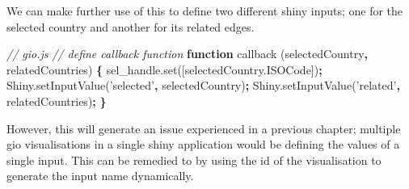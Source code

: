 \documentclass[10pt,]{krantz}
\makeatletter
\newenvironment{Shaded}{\begin{snugshade}}{\end{snugshade}}
\newcommand{\AttributeTok}[1]{\textcolor[rgb]{0.61,0.61,0.61}{#1}}
\newcommand{\CommentTok}[1]{\textcolor[rgb]{0.37,0.37,0.37}{\textit{#1}}}
\newcommand{\KeywordTok}[1]{\textcolor[rgb]{0.27,0.27,0.27}{\textbf{#1}}}
\newcommand{\NormalTok}[1]{#1}
\newcommand{\OperatorTok}[1]{\textcolor[rgb]{0.43,0.43,0.43}{\textbf{#1}}}
\newcommand{\StringTok}[1]{\textcolor[rgb]{0.5,0.5,0.5}{#1}}
\newcommand{\VariableTok}[1]{\textcolor[rgb]{0,0,0}{#1}}
\newenvironment{kframe}{%
\medskip{}
\setlength{\fboxsep}{.8em}
 \def\at@end@of@kframe{}%
 \ifinner\ifhmode%
  \def\at@end@of@kframe{\end{minipage}}%
  \begin{minipage}{\columnwidth}%
 \fi\fi%
 \def\FrameCommand##1{\hskip\@totalleftmargin \hskip-\fboxsep
 \colorbox{shadecolor}{##1}\hskip-\fboxsep
     \hskip-\linewidth \hskip-\@totalleftmargin \hskip\columnwidth}%
 \MakeFramed {\advance\hsize-\width
   \@totalleftmargin\z@ \linewidth\hsize
   \@setminipage}}%
 {\par\unskip\endMakeFramed%
 \at@end@of@kframe}
\renewenvironment{Shaded}{\begin{kframe}}{\end{kframe}}
\makeatother
\begin{document}
We can make further use of this to define two different shiny inputs; one for the selected country and another for its related edges.

\begin{Shaded}
\begin{Highlighting}[]
\CommentTok{// gio.js}
\CommentTok{// define callback function}
\KeywordTok{function} \AttributeTok{callback}\NormalTok{ (selectedCountry}\OperatorTok{,}\NormalTok{ relatedCountries) }\OperatorTok{\{}
  \VariableTok{sel_handle}\NormalTok{.}\AttributeTok{set}\NormalTok{([}\VariableTok{selectedCountry}\NormalTok{.}\AttributeTok{ISOCode}\NormalTok{])}\OperatorTok{;}
  \VariableTok{Shiny}\NormalTok{.}\AttributeTok{setInputValue}\NormalTok{(}\StringTok{'selected'}\OperatorTok{,}\NormalTok{ selectedCountry)}\OperatorTok{;}
  \VariableTok{Shiny}\NormalTok{.}\AttributeTok{setInputValue}\NormalTok{(}\StringTok{'related'}\OperatorTok{,}\NormalTok{ relatedCountries)}\OperatorTok{;}
\OperatorTok{\}}
\end{Highlighting}
\end{Shaded}

However, this will generate an issue experienced in a previous chapter; multiple gio visualisations in a single shiny application would be defining the values of a single input. This can be remedied to by using the id of the visualisation to generate the input name dynamically.
\end{document}
